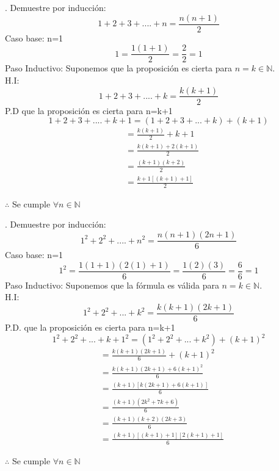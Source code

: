 \documentclass[letterpaper]{article}
\renewcommand{\*}{\cdot}
\theoremstyle{definition}
\begin{document}
. Demuestre por inducción:
$$1+2+3+....+ n = \frac{n(n+1)}{2}$$
Caso base: n=1
$$1 = \frac{1(1+1)}{2} = \frac{2}{2} = 1$$
Paso Inductivo: Suponemos que la proposición es cierta para $n=k \in \mathbb{N}.$\\
H.I:
$$1+2+3+....+ k = \frac{k(k+1)}{2}$$
P.D que la proposición es cierta para n=k+1
$$1+2+3+....+ k + 1 = (1+2+3+...+k) + (k+1)$$
\begin{align*}
	&=\frac{k(k+1)}{2}+k+1\\
	&=\frac{k(k+1)+2(k+1)}{2}\\
	&=\frac{(k+1)(k+2)}{2}\\
	&=\frac{k+1[(k+1)+1]}{2}
\end{align*}

\begin{center}
$\therefore$ Se cumple  $\forall{n} \in \mathbb{N}$
\end{center}

. Demuestre por inducción:
$$1^2+2^2+....+n^2=\frac{n(n+1)(2n+1)}{6}$$
Caso base: n=1
$$1^2=\frac{1(1+1)(2(1)+1)}{6}=\frac{1(2)(3)}{6}=\frac{6}{6}=1$$
Paso Inductivo: Suponemos que la fórmula es válida para $n=k \in \mathbb{N}.$\\
H.I:$$1^2+2^2+...+k^2=\frac{k(k+1)(2k+1)}{6}$$
P.D. que la proposición es cierta para n=k+1
$$ 1^2+2^2+...+k+1^2=(1^2+2^2+...+k^2)+(k+1)^2  $$
\begin{align*}
	&=\frac{k(k+1)(2k+1)}{6}+(k+1)^2\\
	&=\frac{k(k+1)(2k+1)+6(k+1)^2}{6}\\
	&=\frac{(k+1)[k(2k+1)+6(k+1)]}{6}\\
	&=\frac{(k+1)(2k^2+7k+6)}{6}\\
	&=\frac{(k+1)(k+2)(2k+3)}{6}\\
	&=\frac{(k+1)[(k+1)+1][2(k+1)+1]}{6}
\end{align*}
\begin{center}
	$\therefore$ Se  cumple $\forall{n} \in \mathbb{N}$	
\end{center}
\end{document}
